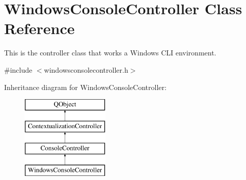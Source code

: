 \hypertarget{classWindowsConsoleController}{}\section{Windows\+Console\+Controller Class Reference}
\label{classWindowsConsoleController}


This is the controller class that works a Windows C\+LI environment.  




{\ttfamily \#include $<$windowsconsolecontroller.\+h$>$}

Inheritance diagram for Windows\+Console\+Controller\+:\begin{figure}[H]
\begin{center}
\leavevmode
\includegraphics[height=4.000000cm]{classWindowsConsoleController}
\end{center}
\end{figure}
